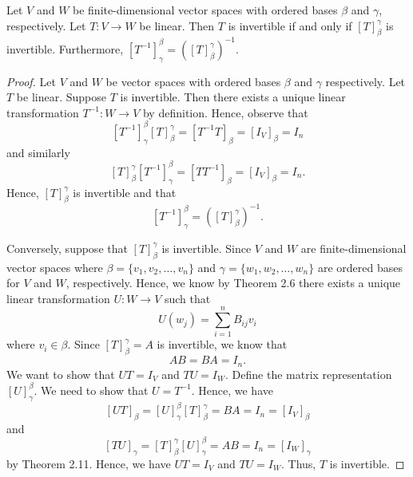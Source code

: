 \begin{theorem}
   Let \( V  \) and \( W  \) be finite-dimensional vector spaces with ordered bases \( \beta \) and \( \gamma  \), respectively. Let \( T: V \to W  \) be linear. Then \( T  \) is invertible if and only if \( [T]_{\beta}^{\gamma}   \) is invertible. Furthermore, \( [T^{-1}]_{\gamma}^{\beta}  = ([T]_{\beta}^{\gamma} )^{-1} \).
\end{theorem}
\begin{proof}
Let \( V  \) and \( W  \) be vector spaces with ordered bases \( \beta  \) and \( \gamma \) respectively. Let \( T  \) be linear. Suppose \( T  \) is invertible. Then there exists a unique linear transformation \( T^{-1}: W \to V  \) by definition. Hence, observe that 
\[  [T^{-1}]_{\gamma}^{\beta}  [T]_{\beta}^{\gamma}  = [T^{-1}T ]_{\beta} = [{I}_{V}]_{\beta} = {I}_{n}  \]
and similarly
\[ [T]_{\beta}^{\gamma}  [T^{-1}]_{\gamma}^{\beta}  = [T T^{-1}]_{\beta} = [{I}_{V}]_{\beta} = {I}_{n}.        \]
Hence, \( [T]_{\beta}^{\gamma}  \) is invertible and that 
\[ [T^{-1}]_{\gamma}^{\beta}  = ([T]_{\beta}^{\gamma} )^{-1}.  \]

Conversely, suppose that \( [T]_{\beta}^{\gamma}  \) is invertible. Since \( V \) and \( W  \) are finite-dimensional vector spaces where  \( \beta = \{ {v}_{1}, {v}_{2}, \dots, {v}_{n} \}  \) and \( \gamma = \{ {w}_{1}, {w}_{2}, \dots, {w}_{n} \}  \) are ordered bases for \( V  \) and \( W  \), respectively. Hence, we know by Theorem 2.6 there exists a unique linear transformation \( U: W \to V  \) such that 
\[  U({w}_{j}) = \sum_{ i = 1   }^{ n } {B}_{ij} {v}_{i}    \]
where \( {v}_{i} \in \beta \). Since \( [T]_{\beta}^{\gamma} = A   \) is invertible, we know that 
\[  AB = BA = I_n.  \] We want to show that \( UT = {I}_{V}  \) and \( TU = {I}_{W} \). Define the matrix representation \( [U]_{\gamma}^{\beta}  \). We need to show that \(  U = T^{-1} \). Hence, we have
\[  [UT]_{\beta} = [U]_{\gamma}^{\beta} [T]_{\beta}^{\gamma} = BA = {I}_{n} = [{I}_{V}]_{\beta}      \]
and 
\[ [TU]_{\gamma} = [T]_{\beta}^{\gamma} [U]_{\gamma}^{\beta} = AB = {I}_{n} = [{I}_{W}]_{\gamma}      \]
by Theorem 2.11. Hence, we have \( UT = {I}_{V}  \) and \( TU = {I}_{W} \). Thus, \( T  \) is invertible.
\end{proof}
